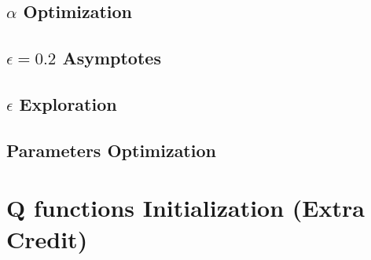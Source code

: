 \documentclass[11pt, a4paper]{article}
\begin{document}
\subsection{$\alpha$ Optimization}

\subsection{$\epsilon = 0.2$ Asymptotes}

\subsection{$\epsilon$ Exploration}

\subsection{Parameters Optimization }

\section{Q functions Initialization (Extra Credit)}


\end{document}
